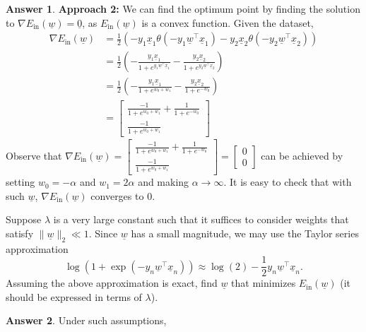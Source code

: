 \documentclass{article}
\theoremstyle{definition}
\newtheorem*{answer}{Answer}
\begin{document}
\begin{question}
\begin{question}
\begin{answer}
			\textbf{Approach 2:} We can find the optimum point by finding the solution to $\nabla E_{\text{in}}(\underline{w}) = \underline{0}$, as $E_{\text{in}}(\underline{w})$ is a convex function. Given the dataset,
			\begin{align*}
				\nabla E_{\text{in}}(\underline{w}) &= \frac{1}{2} \left(-y_1 \underline{x}_1 \theta(-y_1 \underline{w}^\top \underline{x}_1) -y_2 \underline{x}_2 \theta(-y_2 \underline{w}^\top \underline{x}_2)\right)\\
				&= \frac{1}{2} \left( -\frac{y_1 \underline{x}_1}{1+e^{y_1 \underline{w}^\top \underline{x}_1}} - \frac{y_2 \underline{x}_2}{1+e^{y_2 \underline{w}^\top \underline{x}_2}}\right)\\
				&= \frac{1}{2} \left( -\frac{y_1 \underline{x}_1}{1+e^{w_0 + w_1}} - \frac{y_2 \underline{x}_2}{1+e^{-w_0}}\right)\\
				&= \begin{bmatrix}
					\frac{-1}{1+e^{w_0 + w_1}} + \frac{1}{1+e^{-w_0}}\\
					\frac{-1}{1+e^{w_0 + w_1}}
				\end{bmatrix}
			\end{align*}
			Observe that $\nabla E_{\text{in}}(\underline{w}) = \begin{bmatrix}
				\frac{-1}{1+e^{w_0 + w_1}} + \frac{1}{1+e^{-w_0}}\\
				\frac{-1}{1+e^{w_0 + w_1}}
			\end{bmatrix} = \begin{bmatrix}
			0\\
			0
			\end{bmatrix}$ can be achieved by setting $w_0=-\alpha$ and $w_1= 2\alpha$ and making $\alpha \rightarrow \infty$. It is easy to check that with such $\underline{w}$, $\nabla E_{\text{in}}(\underline{w})$ converges to $0$. 
		\end{answer}
		\item Suppose $\lambda$ is a very large constant such that it suffices to consider weights that satisfy $\|\underline{w}\|_2 \ll 1$. Since $\underline{w}$ has a small magnitude, we may use the Taylor series approximation
		\[
		\log(1 + \exp(-y_n \underline{w}^\top \underline{x}_n)) \approx \log(2) - \frac{1}{2} y_n \underline{w}^\top \underline{x}_n.
		\]
		Assuming the above approximation is exact, find $\underline{w}$ that minimizes $E_{\text{in}}(\underline{w})$ (it should be expressed in terms of $\lambda$).
		\begin{answer}
			Under such assumptions, 
			\begin{align*}

\end{align*}
\end{answer}
\end{question}
\end{question}
\end{document}
